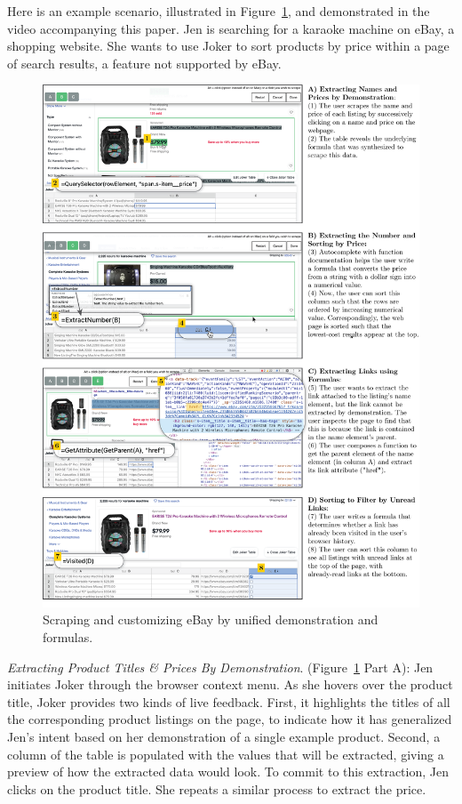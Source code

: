 \documentclass[conference]{IEEEtran}
\begin{document}
Here is an example scenario, illustrated in Figure~\ref{fig:ebay}, and
demonstrated in the video accompanying this paper. Jen is searching for
a karaoke machine on eBay, a shopping website. She wants to use Joker to
sort products by price within a page of search results, a feature not
supported by eBay.

\begin{figure}
  \includegraphics[width=\textwidth]{media/ebay.png}
  \caption{\label{fig:ebay}Scraping and customizing eBay by unified demonstration and formulas.}
\end{figure}

\emph{Extracting Product Titles \& Prices By Demonstration}.
(Figure~\ref{fig:ebay} Part A): Jen initiates Joker through the browser
context menu. As she hovers over the product title, Joker provides two
kinds of live feedback. First, it highlights the titles of all the
corresponding product listings on the page, to indicate how it has
generalized Jen's intent based on her demonstration of a single example
product. Second, a column of the table is populated with the values that
will be extracted, giving a preview of how the extracted data would
look. To commit to this extraction, Jen clicks on the product title. She
repeats a similar process to extract the price.
\end{document}
